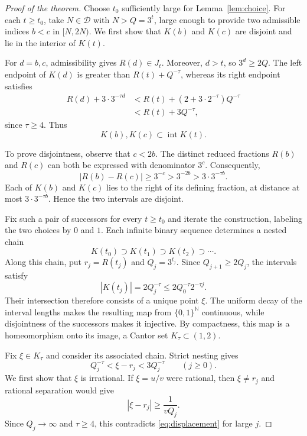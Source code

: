 \documentclass[11pt,reqno]{amsart}
\theoremstyle{definition}
\newcommand{\N}{\mathbb N}
\newcommand{\DD}{\mathcal D}
\begin{document}
\begin{proof}[Proof of the theorem]
Choose $t_0$ sufficiently large for Lemma~\ref{lem:choice}.
For each $t\ge t_0$, take $N\in\DD$ with
$N>Q=3^t$, large enough to provide two admissible
indices $b<c$ in $[N,2N)$. We first show that
$K(b)$ and $K(c)$ are disjoint and lie in the
interior of $K(t)$.

For $d=b,c$, admissibility gives $R(d)\in J_t$.
Moreover, $d>t$, so $3^d\ge2Q$. The left endpoint
of $K(d)$ is greater than $R(t)+Q^{-\tau}$,
whereas its right endpoint satisfies
\[
 \begin{aligned}
 R(d)+3\cdot3^{-\tau d}
 &<R(t)+(2+3\cdot2^{-\tau})Q^{-\tau}\\
 &<R(t)+3Q^{-\tau},
 \end{aligned}
\]
since $\tau\ge4$. Thus
\[
 K(b),K(c)\subset\operatorname{int}K(t).
\]

To prove disjointness, observe that $c<2b$.
The distinct reduced fractions $R(b)$ and $R(c)$
can both be expressed with denominator $3^c$.
Consequently,
\[
 |R(b)-R(c)|
 \ge3^{-c}>3^{-2b}
 >3\cdot3^{-\tau b}.
\]
Each of $K(b)$ and $K(c)$ lies to the right
of its defining fraction, at distance at most
$3\cdot3^{-\tau b}$. Hence the two intervals
are disjoint.

Fix such a pair of successors for every $t\ge t_0$
and iterate the construction, labeling the two
choices by $0$ and $1$. Each infinite binary
sequence determines a nested chain
\[
 K(t_0)\supset K(t_1)\supset K(t_2)\supset\cdots.
\]
Along this chain, put
$r_j=R(t_j)$ and $Q_j=3^{t_j}$. Since
$Q_{j+1}\ge2Q_j$, the intervals satisfy
\[
 |K(t_j)|=2Q_j^{-\tau}
 \le2Q_0^{-\tau}2^{-\tau j}.
\]
Their intersection therefore consists of a unique
point $\xi$. The uniform decay of the interval
lengths makes the resulting map from
$\{0,1\}^{\N}$ continuous, while disjointness
of the successors makes it injective.
By compactness, this map is a homeomorphism
onto its image, a Cantor set
$K_\tau\subset(1,2)$.

Fix $\xi\in K_\tau$ and consider its associated
chain. Strict nesting gives
\begin{equation}\label{eq:displacement}
 Q_j^{-\tau}<\xi-r_j<3Q_j^{-\tau}
 \qquad(j\ge0).
\end{equation}
We first show that $\xi$ is irrational.
If $\xi=u/v$ were rational, then
$\xi\ne r_j$ and rational separation would give
\[
 |\xi-r_j|\ge\frac1{vQ_j}.
\]
Since $Q_j\to\infty$ and $\tau\ge4$, this
contradicts \eqref{eq:displacement} for large $j$.


\end{proof}
\end{document}

